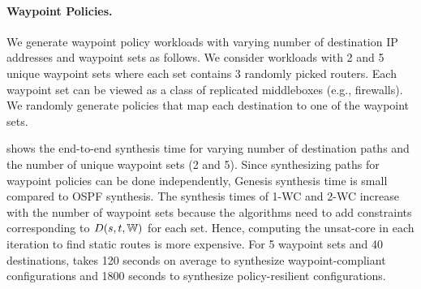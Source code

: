 \begin{figure}
	\begin{center}
	\end{center} 
\end{figure}
\paragraph{Waypoint Policies.}
We generate waypoint policy 
workloads with varying number of destination IP addresses and 
waypoint sets as follows. 
We consider workloads with 2 and 5 unique waypoint 
sets where each set contains 3 randomly picked routers.  
Each waypoint set can be 
viewed as a class of replicated middleboxes (e.g., firewalls).
We randomly generate policies that map each destination to one of the waypoint sets. 


 shows the end-to-end synthesis
 time for varying number of destination paths and the 
 number of unique waypoint sets (2 and 5). 
 Since synthesizing paths
 for waypoint policies can be done independently,
Genesis synthesis time is small compared to OSPF synthesis. 
The synthesis times of 1-WC and 2-WC 
increase with the number of waypoint sets because
the algorithms 
need to add constraints corresponding to $D(s,t,\mathbb{W})$ 
for each set. Hence, computing the unsat-core in each
iteration to find static routes is more expensive. 
For 5 waypoint sets and 40 destinations, \name takes 120 
seconds on average to synthesize waypoint-compliant configurations
and 1800 seconds to synthesize policy-resilient configurations.

